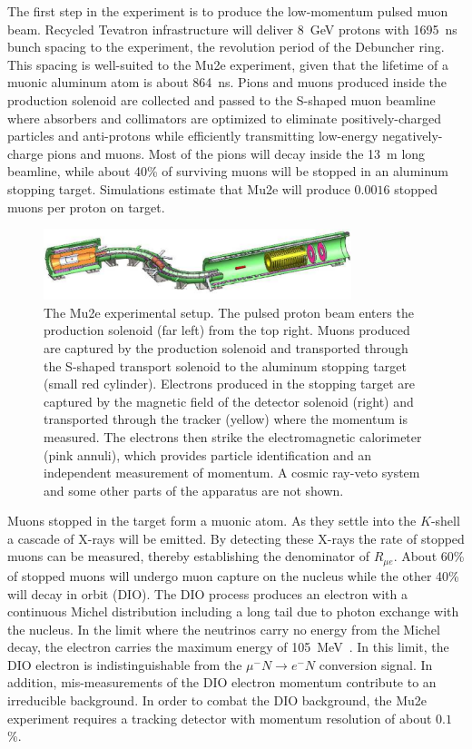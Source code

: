 The first step in the experiment is to produce the low-momentum pulsed
muon beam.  Recycled Tevatron infrastructure will deliver 8~GeV
protons with 1695~ns bunch spacing to the experiment, the
revolution period of the Debuncher ring. This spacing is well-suited to the Mu2e
experiment, given that the lifetime of a muonic aluminum atom is about
864~ns.  Pions and muons produced inside the production solenoid are
collected and passed to the S-shaped muon beamline where absorbers and
collimators are optimized to eliminate positively-charged particles
and anti-protons while efficiently transmitting low-energy
negatively-charge pions and muons.  Most of the pions will decay
inside the 13~m long beamline, while about 40\% of surviving muons
will be stopped in an aluminum stopping target.  Simulations estimate
that Mu2e will produce $0.0016$ stopped muons per proton on target.



\begin{figure}
\centering
\includegraphics[width=0.8\textwidth]{ChargedLeptons/Figures/mu2edisk_scaled.pdf}
\caption{The Mu2e experimental setup. The pulsed proton beam enters
the production solenoid (far left) from the top right.  Muons
produced are captured by the production solenoid and transported
through the S-shaped transport solenoid to the aluminum stopping
target (small red cylinder).  Electrons produced in the stopping
target are captured by the magnetic field of the detector solenoid
(right) and transported through the tracker (yellow) where the
momentum is measured.  The electrons then strike the electromagnetic
calorimeter (pink annuli), which provides particle identification and an independent measurement of momentum.
A cosmic ray-veto system and some other parts of the apparatus are not
shown.
}
\label{cl:fig:mu2e}
\end{figure}



Muons stopped in the target form a muonic atom.  As they settle into
the $K$-shell a cascade of X-rays will be emitted.  By detecting these
X-rays the rate of stopped muons can be measured, thereby establishing
the denominator of $R_{\mu e}$. About 60\% of stopped muons will
undergo muon capture on the nucleus while the other 40\% will decay in
orbit (DIO).  The DIO process produces an electron with a continuous
Michel distribution including a long tail due to photon exchange with
the nucleus.  In the limit where the neutrinos carry no energy from
the Michel decay, the electron carries the maximum energy of 105~MeV~\cite{czarnecki}.
In this limit, the DIO electron is indistinguishable from the $\mu^-N
\rightarrow e^-N$ conversion signal.  In addition, mis-measurements of
the DIO electron momentum contribute to an irreducible background.
In order to combat the DIO background, the Mu2e experiment requires a
tracking detector with momentum resolution of about $0.1$\%.


